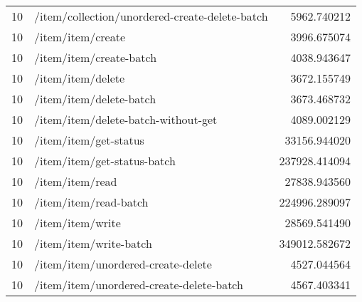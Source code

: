 \begin{longtable}{rlr}
10 & /item/collection/unordered-create-delete-batch & 5962.740212 \\
10 & /item/item/create & 3996.675074 \\
10 & /item/item/create-batch & 4038.943647 \\
10 & /item/item/delete & 3672.155749 \\
10 & /item/item/delete-batch & 3673.468732 \\
10 & /item/item/delete-batch-without-get & 4089.002129 \\
10 & /item/item/get-status & 33156.944020 \\
10 & /item/item/get-status-batch & 237928.414094 \\
10 & /item/item/read & 27838.943560 \\
10 & /item/item/read-batch & 224996.289097 \\
10 & /item/item/write & 28569.541490 \\
10 & /item/item/write-batch & 349012.582672 \\
10 & /item/item/unordered-create-delete & 4527.044564 \\
10 & /item/item/unordered-create-delete-batch & 4567.403341 \\
\end{longtable}
